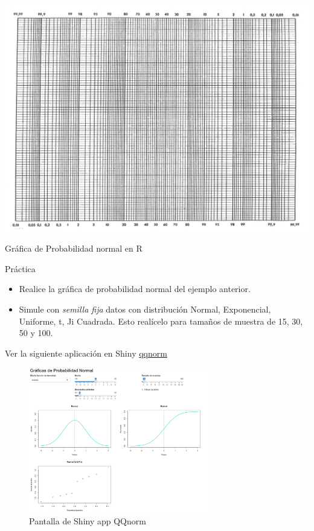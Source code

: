 \documentclass[
  10pt,
  ignorenonframetext,
]{beamer}
\begin{document}
\begin{frame}{}
\protect\hypertarget{section-47}{}
\includegraphics{figuras/probpaperLandscape.png}
\end{frame}

\begin{frame}{Gráfica de Probabilidad normal en R}
\protect\hypertarget{gruxe1fica-de-probabilidad-normal-en-r}{}
\begin{block}{Práctica}
\protect\hypertarget{pruxe1ctica}{}
\begin{itemize}
\item
  Realice la gráfica de probabilidad normal del ejemplo anterior.
\item
  Simule con \emph{semilla fija} datos con distribución Normal,
  Exponencial, Uniforme, t, Ji Cuadrada. Esto realícelo para tamaños de
  muestra de 15, 30, 50 y 100.
\end{itemize}
\end{block}
\end{frame}

\begin{frame}{}
\protect\hypertarget{section-48}{}
Ver la siguiente aplicación en Shiny
\href{https://s3rgionava.shinyapps.io/QQnorm/?_ga=2.74771473.2040383487.1666298329-1276638344.1663958366}{qqnorm}

\begin{figure}
\centering
\includegraphics[width=0.7\textwidth,height=\textheight]{figuras/QQnorm.png}
\caption{Pantalla de Shiny app QQnorm}
\end{figure}
\end{frame}
\end{document}
